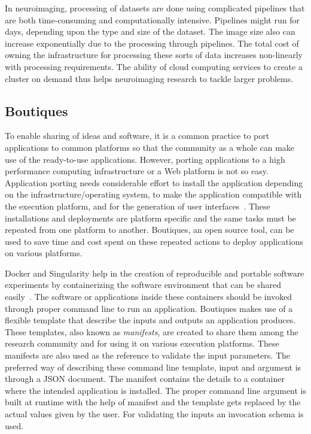 In neuroimaging, processing of datasets are done using complicated pipelines that are both time-consuming and computationally intensive. Pipelines might run for days, depending upon the type and size of the dataset. The image size also can increase exponentially due to the processing through pipelines. The total cost of owning the infrastructure for processing these sorts of data increases non-linearly with processing requirements. The ability of cloud computing services to create a cluster on demand thus helps neuroimaging research to tackle larger problems.

\subsection{Boutiques}
To enable sharing of ideas and software, it is a common practice to port applications to common platforms so that the community as a whole can make use of the ready-to-use applications. However, porting applications to a high performance computing infrastructure or a Web platform is not so easy. Application porting needs considerable effort to install the application depending on the infrastructure/operating system, to make the application compatible with the execution platform, and for the generation of user interfaces~\cite{boutiques}. These installations and deployments are platform specific and the same tasks must be repeated from one platform to another. Boutiques, an open source tool, can be used to save time and cost spent on these repeated actions to deploy applications on various platforms.

Docker and Singularity help in the creation of reproducible and portable software experiments by containerizing the software environment that can be shared easily~\cite{boutiques}. The software or applications inside these containers should be invoked through proper command line to run an application. Boutiques makes use of a flexible template that describe the inputs and outputs an application produces. These templates, also known as \textit{manifests}, are created to share them among the research community and for using it on various execution platforms. These manifests are also used as the reference to validate the input parameters. The preferred way of describing these command line template, input and argument is through a JSON document. The manifest contains the details to a container where the intended application is installed. The proper command line argument is built at runtime with the help of manifest and the template gets replaced by the actual values given by the user. For validating the inputs an invocation schema is used.


